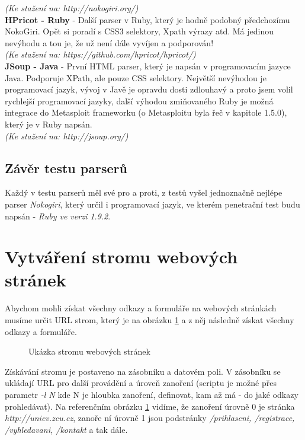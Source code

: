 \documentclass[12pt, a4paper]{report}
\begin{document}
\textit{(Ke stažení na: http://nokogiri.org/)}\\
\newline
\textbf{HPricot - Ruby} - Další parser v Ruby, který je hodně podobný předchozímu NokoGiri. Opět si poradí s CSS3 selektory, Xpath výrazy atd. Má jedinou nevýhodu a tou je, že už není dále vyvíjen a podporován!\\
\textit{(Ke stažení na: https://github.com/hpricot/hpricot/)}\\
\newline
\textbf{JSoup - Java} - První HTML parser, který je napsán v programovacím jazyce Java. Podporuje XPath, ale pouze CSS selektory. Největší nevýhodou je programovací jazyk, vývoj v Javě je opravdu dosti zdlouhavý a proto jsem volil rychlejší programovací jazyky, další výhodou zmiňovaného Ruby je možná integrace do Metasploit frameworku (o Metasploitu byla řeč v kapitole 1.5.0), který je v Ruby napsán.\\
\textit{(Ke stažení na: http://jsoup.org/)}

\subsection{Závěr testu parserů}
Každý v testu parserů měl své pro a proti, z testů vyšel jednoznačně nejlépe parser \textit{Nokogiri}, který určil i programovací jazyk, ve kterém penetrační test budu napsán - \textit{Ruby ve verzi 1.9.2}. 

\section{Vytváření stromu webových stránek}
Abychom mohli získat všechny odkazy a formuláře na webových stránkách musíme určit URL strom, který je na obrázku \ref{obr.url_tree} a z něj následně získat všechny odkazy a formuláře.
\begin{figure}[h!]
\caption{Ukázka stromu webových stránek}
\label{obr.url_tree}
\end{figure}
Získávání stromu je postaveno na zásobníku a datovém poli. V zásobníku se ukládají URL pro další provádění a úroveň zanoření (scriptu je možné přes parametr \textit{-l N} kde N je hloubka zanoření, definovat, kam až má - do jaké  odkazy prohledávat). Na referenčním obrázku \ref{obr.url_tree} vidíme, že zanoření úrovně 0 je stránka \textit{http://unicv.zcu.cz}, zanoře ní úrovně 1 jsou podstránky \textit{/prihlaseni, /registrace, /vyhledavani, /kontakt} a tak dále.
\end{document}
